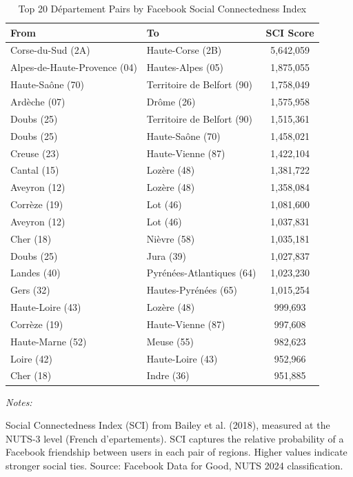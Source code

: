 \begin{table}[!h]
\centering
\caption{Top 20 D\'{e}partement Pairs by Facebook Social Connectedness Index}
\centering
\fontsize{9}{11}\selectfont
\begin{threeparttable}
\begin{tabular}[t]{llc}
\toprule
From & To & SCI Score\\
\midrule
Corse-du-Sud (2A) & Haute-Corse (2B) & 5,642,059\\
Alpes-de-Haute-Provence (04) & Hautes-Alpes (05) & 1,875,055\\
Haute-Saône (70) & Territoire de Belfort (90) & 1,758,049\\
Ardèche (07) & Drôme (26) & 1,575,958\\
Doubs (25) & Territoire de Belfort (90) & 1,515,361\\
Doubs (25) & Haute-Saône (70) & 1,458,021\\
Creuse (23) & Haute-Vienne (87) & 1,422,104\\
Cantal (15) & Lozère (48) & 1,381,722\\
Aveyron (12) & Lozère (48) & 1,358,084\\
Corrèze (19) & Lot (46) & 1,081,600\\
Aveyron (12) & Lot (46) & 1,037,831\\
Cher (18) & Nièvre (58) & 1,035,181\\
Doubs (25) & Jura (39) & 1,027,837\\
Landes (40) & Pyrénées-Atlantiques (64) & 1,023,230\\
Gers (32) & Hautes-Pyrénées (65) & 1,015,254\\
Haute-Loire (43) & Lozère (48) & 999,693\\
Corrèze (19) & Haute-Vienne (87) & 997,608\\
Haute-Marne (52) & Meuse (55) & 982,623\\
Loire (42) & Haute-Loire (43) & 952,966\\
Cher (18) & Indre (36) & 951,885\\
\bottomrule
\end{tabular}
\begin{tablenotes}
\item \textit{Notes:} 
\item Social Connectedness Index (SCI) from Bailey et al. (2018), measured at the NUTS-3 level (French d'{e}partements). SCI captures the relative probability of a Facebook friendship between users in each pair of regions. Higher values indicate stronger social ties. Source: Facebook Data for Good, NUTS 2024 classification.
\end{tablenotes}
\end{threeparttable}
\end{table}
